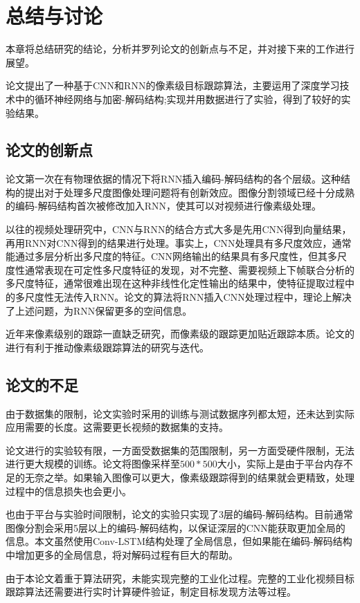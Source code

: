 
\chapter{总结与讨论}
本章将总结研究的结论，分析并罗列论文的创新点与不足，并对接下来的工作进行展望。
\par
论文提出了一种基于CNN和RNN的像素级目标跟踪算法，主要运用了深度学习技术中的循环神经网络与加密-解码结构;实现并用数据进行了实验，得到了较好的实验结果。
\section{论文的创新点}
论文第一次在有物理依据的情况下将RNN插入编码-解码结构的各个层级。这种结构的提出对于处理多尺度图像处理问题将有创新效应。图像分割领域已经十分成熟的编码-解码结构首次被修改加入RNN，使其可以对视频进行像素级处理。
\par
以往的视频处理研究中，CNN与RNN的结合方式大多是先用CNN得到向量结果，再用RNN对CNN得到的结果进行处理。事实上，CNN处理具有多尺度效应，通常能通过多层分析出多尺度的特征。CNN网络输出的结果具有多尺度性，但其多尺度性通常表现在可定性多尺度特征的发现，对不完整、需要视频上下帧联合分析的多尺度特征，通常很难出现在这种非线性化定性输出的结果中，使特征提取过程中的多尺度性无法传入RNN。论文的算法将RNN插入CNN处理过程中，理论上解决了上述问题，为RNN保留更多的空间信息。
\par
近年来像素级别的跟踪一直缺乏研究，而像素级的跟踪更加贴近跟踪本质。论文的进行有利于推动像素级跟踪算法的研究与迭代。
\section{论文的不足}
由于数据集的限制，论文实验时采用的训练与测试数据序列都太短，还未达到实际应用需要的长度。这需要更长视频的数据集的支持。
\par
论文进行的实验较有限，一方面受数据集的范围限制，另一方面受硬件限制，无法进行更大规模的训练。论文将图像采样至$500*500$大小，实际上是由于平台内存不足的无奈之举。如果输入图像可以更大，像素级跟踪得到的结果就会更精致，处理过程中的信息损失也会更小。
\par
也由于平台与实验时间限制，论文的实验只实现了3层的编码-解码结构。目前通常图像分割会采用5层以上的编码-解码结构，以保证深层的CNN能获取更加全局的信息。本文虽然使用Conv-LSTM结构处理了全局信息，但如果能在编码-解码结构中增加更多的全局信息，将对解码过程有巨大的帮助。
\par
由于本论文着重于算法研究，未能实现完整的工业化过程。完整的工业化视频目标跟踪算法还需要进行实时计算硬件验证，制定目标发现方法等过程。

